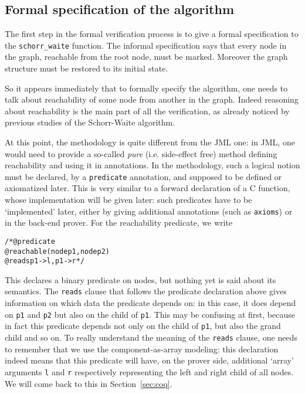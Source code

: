 \subsection{Formal specification of the algorithm}
\label{sec:spec}

The first step in the formal verification process is to give a formal
specification to the \verb|schorr_waite| function. The informal
specification says that every node in the graph, reachable from the
root node, must be marked. Moreover the graph structure must be
restored to its initial state.

So it appears immediately that to formally specify the algorithm, one
needs to talk about reachability of some node from another in the
graph. Indeed reasoning about reachability is the main part of all the
verification, as already noticed by previous studies of the
Schorr-Waite algorithm.

At this point, the \caduceus{} methodology is quite different from the
JML one: in JML, one would need to provide a so-called \emph{pure}
(i.e. side-effect free) method defining reachability and using it in
annotations. 
In the \caduceus{} methodology, such a logical notion must be
declared, by a \verb|predicate| annotation, and supposed to be defined
or axiomatized later. This is very similar to a
forward declaration of a C function, whose implementation will be
given later: such predicates have to be `implemented' later, either by
giving additional \caduceus{} annotations (such as \verb|axioms|) or
in the back-end prover. For the reachability predicate, we write
\begin{alltt}\begin{slshape}
/*@ predicate 
  @   reachable(node p1, node p2) 
  @   reads p1->l,p1->r */
\end{slshape}\end{alltt}
This declares a binary predicate on nodes, but nothing yet is
said about its semantics. The \texttt{reads} clause that follows the predicate
declaration above gives information on which data the predicate
depends on: in this case, it does depend on \verb|p1| and
\verb|p2| but also on the child of \verb|p1|. This may be confusing
at first, because in fact this predicate depends not only on the
child of \verb|p1|, but also the grand child and so on. To
really understand the meaning of the \texttt{reads} clause, one needs
to remember that we use the component-as-array modeling: this
declaration indeed means that this predicate will have, on the prover
side, additional `array' arguments \verb|l| and \verb|r| respectively
representing the left and right child of all nodes. We will come back
to this in Section~\ref{sec:coq}.


